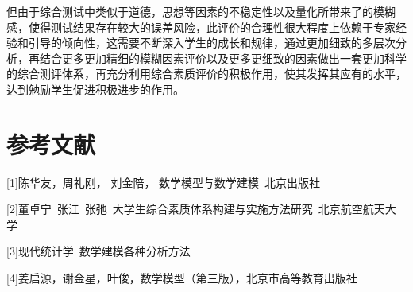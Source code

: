 \documentclass{ctexart}
\begin{document}
但由于综合测试中类似于道德，思想等因素的不稳定性以及量化所带来了的模糊感，使得测试结果存在较大的误差风险，此评价的合理性很大程度上依赖于专家经验和引导的倾向性，这需要不断深入学生的成长和规律，通过更加细致的多层次分析，再结合更多更加精细的模糊因素评价以及更多更细致的因素做出一套更加科学的综合测评体系，再充分利用综合素质评价的积极作用，使其发挥其应有的水平，达到勉励学生促进积极进步的作用。

\section{参考文献}
[1]陈华友，周礼刚， 刘金陪，  数学模型与数学建模\ 北京出版社

[2]董卓宁\ 张江\ 张弛\ 大学生综合素质体系构建与实施方法研究\ 北京航空航天大学

[3]现代统计学\ 数学建模各种分析方法

[4]姜启源，谢金星，叶俊，数学模型（第三版），北京市高等教育出版社
\end{document}
